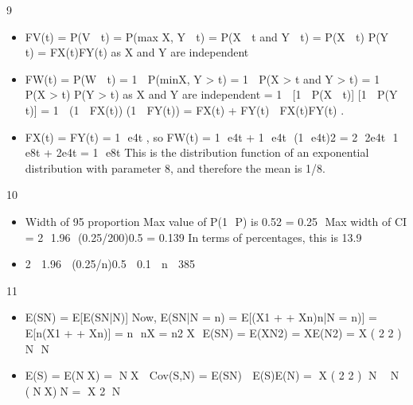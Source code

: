 \documentclass[a4paper,12pt]{article}
\begin{document}
9
\begin{itemize}
\item
FV(t) = P(V  t) = P(max {X, Y}  t)
= P(X  t and Y  t) = P(X  t) P(Y  t) = FX(t)FY(t) as X and Y are independent
\item
FW(t) = P(W  t) = 1  P(min{X, Y} > t)
= 1  P(X > t and Y > t) = 1  P(X > t) P(Y > t) as X and Y are independent
= 1  [1  P(X  t)] [1  P(Y  t)]
= 1  (1  FX(t)) (1  FY(t))
= FX(t) + FY(t)  FX(t)FY(t) .
\item
FX(t) = FY(t) = 1  e4t , so
FW(t) = 1  e4t + 1  e4t  (1  e4t)2
= 2  2e4t  1  e8t + 2e4t
= 1  e8t
This is the distribution function of an exponential distribution with parameter 8, and
therefore the mean is 1/8.
\end{itemize}

10  
\begin{itemize}
\item Width of 95%
proportion
Max value of P(1  P) is 0.52 = 0.25
 Max width of CI = 2  1.96  (0.25/200)0.5 = 0.139
In terms of percentages, this is 13.9%
\item 2  1.96  (0.25/n)0.5  0.1  n  385
\end{itemize}
11 
\begin{itemize}
\item E(SN) = E[E(SN|N)]
Now, E(SN|N = n) = E[(X1 + + Xn)n|N = n)] = E[n(X1 + + Xn)]
= n  nX = n2
X
 E(SN) = E(XN2) = XE(N2)
= X
( 2 2 ) N  N

\item E(S) = E(NX) = NX
 Cov(S,N) = E(SN)  E(S)E(N) = X
( 2 2 ) N  N  (NX)N = X
2
N

\end{itemize}
\end{document}
